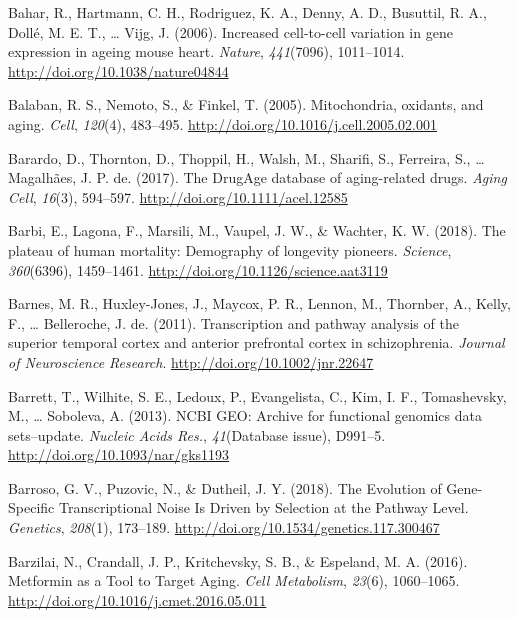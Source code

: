 \documentclass[12pt,twoside]{unicam}
\begin{document}
\begin{cslreferences}
\leavevmode\hypertarget{ref-Bahar2006}{}%
Bahar, R., Hartmann, C. H., Rodriguez, K. A., Denny, A. D., Busuttil, R. A., Dollé, M. E. T., \ldots{} Vijg, J. (2006). Increased cell-to-cell variation in gene expression in ageing mouse heart. \emph{Nature}, \emph{441}(7096), 1011--1014. \url{http://doi.org/10.1038/nature04844}

\leavevmode\hypertarget{ref-Balaban2005}{}%
Balaban, R. S., Nemoto, S., \& Finkel, T. (2005). Mitochondria, oxidants, and aging. \emph{Cell}, \emph{120}(4), 483--495. \url{http://doi.org/10.1016/j.cell.2005.02.001}

\leavevmode\hypertarget{ref-Barardo2017}{}%
Barardo, D., Thornton, D., Thoppil, H., Walsh, M., Sharifi, S., Ferreira, S., \ldots{} Magalhães, J. P. de. (2017). The DrugAge database of aging-related drugs. \emph{Aging Cell}, \emph{16}(3), 594--597. \url{http://doi.org/10.1111/acel.12585}

\leavevmode\hypertarget{ref-Barbi2018}{}%
Barbi, E., Lagona, F., Marsili, M., Vaupel, J. W., \& Wachter, K. W. (2018). The plateau of human mortality: Demography of longevity pioneers. \emph{Science}, \emph{360}(6396), 1459--1461. \url{http://doi.org/10.1126/science.aat3119}

\leavevmode\hypertarget{ref-Barnes2011}{}%
Barnes, M. R., Huxley-Jones, J., Maycox, P. R., Lennon, M., Thornber, A., Kelly, F., \ldots{} Belleroche, J. de. (2011). Transcription and pathway analysis of the superior temporal cortex and anterior prefrontal cortex in schizophrenia. \emph{Journal of Neuroscience Research}. \url{http://doi.org/10.1002/jnr.22647}

\leavevmode\hypertarget{ref-Barrett2013}{}%
Barrett, T., Wilhite, S. E., Ledoux, P., Evangelista, C., Kim, I. F., Tomashevsky, M., \ldots{} Soboleva, A. (2013). NCBI GEO: Archive for functional genomics data sets--update. \emph{Nucleic Acids Res.}, \emph{41}(Database issue), D991--5. \url{http://doi.org/10.1093/nar/gks1193}

\leavevmode\hypertarget{ref-Barroso2018}{}%
Barroso, G. V., Puzovic, N., \& Dutheil, J. Y. (2018). The Evolution of Gene-Specific Transcriptional Noise Is Driven by Selection at the Pathway Level. \emph{Genetics}, \emph{208}(1), 173--189. \url{http://doi.org/10.1534/genetics.117.300467}

\leavevmode\hypertarget{ref-Barzilai2016}{}%
Barzilai, N., Crandall, J. P., Kritchevsky, S. B., \& Espeland, M. A. (2016). Metformin as a Tool to Target Aging. \emph{Cell Metabolism}, \emph{23}(6), 1060--1065. \url{http://doi.org/10.1016/j.cmet.2016.05.011}


\end{cslreferences}
\end{document}
